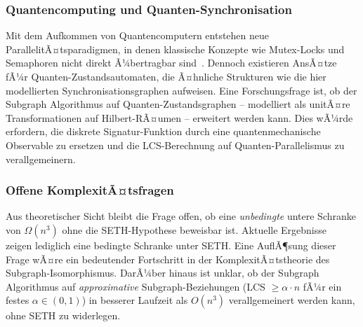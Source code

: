 ﻿\documentclass[a4paper,12pt]{article}
\theoremstyle{definition}
\begin{document}
\subsubsection{Quantencomputing und Quanten-Synchronisation}

Mit dem Aufkommen von Quantencomputern entstehen neue ParallelitÃ¤tsparadigmen,
in denen klassische Konzepte wie Mutex-Locks und Semaphoren nicht direkt
Ã¼bertragbar sind~\cite{gay2006quantum}. Dennoch existieren AnsÃ¤tze fÃ¼r
Quanten-Zustandsautomaten, die Ã¤hnliche Strukturen wie die hier modellierten
Synchronisationsgraphen aufweisen. Eine Forschungsfrage ist, ob der Subgraph
Algorithmus auf Quanten-Zustandsgraphen -- modelliert als unitÃ¤re
Transformationen auf Hilbert-RÃ¤umen -- erweitert werden kann. Dies wÃ¼rde
erfordern, die diskrete Signatur-Funktion durch eine quantenmechanische
Observable zu ersetzen und die LCS-Berechnung auf Quanten-Parallelismus
zu verallgemeinern.

\subsubsection{Offene KomplexitÃ¤tsfragen}

Aus theoretischer Sicht bleibt die Frage offen, ob eine \emph{unbedingte}
untere Schranke von $\Omega(n^3)$ ohne die SETH-Hypothese beweisbar ist.
Aktuelle Ergebnisse~\cite{abboud2015tight} zeigen lediglich eine bedingte
Schranke unter SETH. Eine AuflÃ¶sung dieser Frage wÃ¤re ein bedeutender
Fortschritt in der KomplexitÃ¤tstheorie des Subgraph-Isomorphismus.
DarÃ¼ber hinaus ist unklar, ob der Subgraph Algorithmus auf
\emph{approximative} Subgraph-Beziehungen (LCS $\geq \alpha \cdot n$ fÃ¼r
ein festes $\alpha \in (0, 1)$) in besserer Laufzeit als $O(n^3)$
verallgemeinert werden kann, ohne SETH zu widerlegen.
\end{document}
